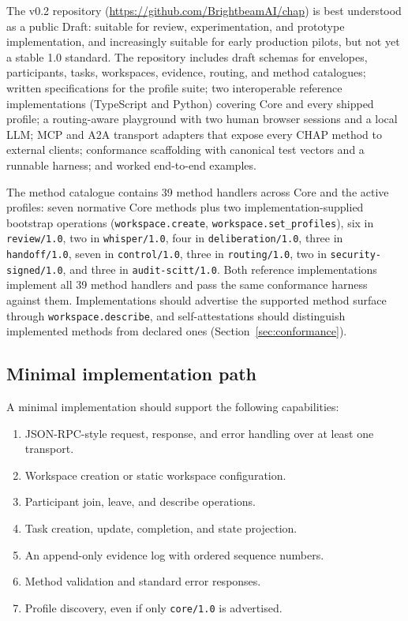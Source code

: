 \documentclass[11pt]{article}
\begin{document}
The v0.2 repository (\url{https://github.com/BrightbeamAI/chap}) is best understood as a public Draft: suitable for review, experimentation, and prototype implementation, and increasingly suitable for early production pilots, but not yet a stable 1.0 standard. The repository includes draft schemas for envelopes, participants, tasks, workspaces, evidence, routing, and method catalogues; written specifications for the profile suite; two interoperable reference implementations (TypeScript and Python) covering Core and every shipped profile; a routing-aware playground with two human browser sessions and a local LLM; MCP and A2A transport adapters that expose every CHAP method to external clients; conformance scaffolding with canonical test vectors and a runnable harness; and worked end-to-end examples.

The method catalogue contains 39 method handlers across Core and the active profiles: seven normative Core methods plus two implementation-supplied bootstrap operations (\texttt{workspace.create}, \texttt{workspace.set\_profiles}), six in \texttt{review/1.0}, two in \texttt{whisper/1.0}, four in \texttt{deliberation/1.0}, three in \texttt{handoff/1.0}, seven in \texttt{control/1.0}, three in \texttt{routing/1.0}, two in \texttt{security-signed/1.0}, and three in \texttt{audit-scitt/1.0}. Both reference implementations implement all 39 method handlers and pass the same conformance harness against them. Implementations should advertise the supported method surface through \texttt{workspace.describe}, and self-attestations should distinguish implemented methods from declared ones (Section~\ref{sec:conformance}).

\subsection{Minimal implementation path}

A minimal implementation should support the following capabilities:

\begin{enumerate}[leftmargin=*]
    \item JSON-RPC-style request, response, and error handling over at least one transport.
    \item Workspace creation or static workspace configuration.
    \item Participant join, leave, and describe operations.
    \item Task creation, update, completion, and state projection.
    \item An append-only evidence log with ordered sequence numbers.
    \item Method validation and standard error responses.
    \item Profile discovery, even if only \texttt{core/1.0} is advertised.
\end{enumerate}
\end{document}
